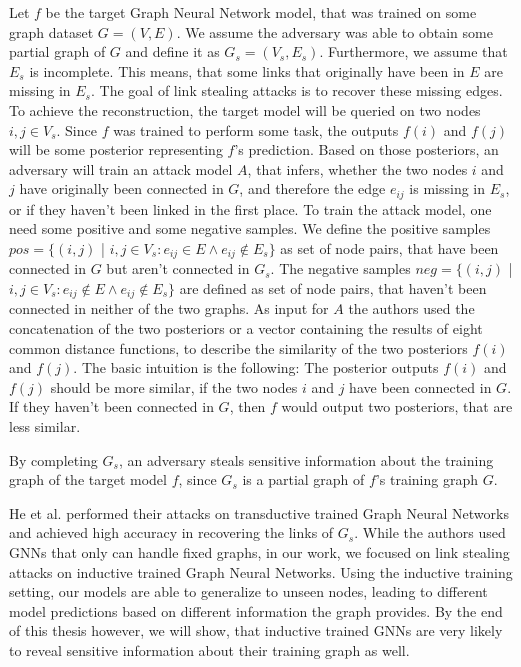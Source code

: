     Let $f$ be the target Graph Neural Network model, that was trained on some graph dataset $G = (V, E)$.
    We assume the adversary was able to obtain some partial graph of $G$ and define it as $G_s = (V_s, E_s)$.
    Furthermore, we assume that $E_s$ is incomplete.
    This means, that some links that originally have been in $E$ are missing in $E_s$.
    The goal of link stealing attacks is to recover these missing edges.
    To achieve the reconstruction, the target model will be queried on two nodes $i,j \in V_s$.
    Since $f$ was trained to perform some task, the outputs $f(i)$ and $f(j)$ will be some posterior representing $f$'s prediction.
    Based on those posteriors, an adversary will train an attack model $A$, that infers, whether the two nodes $i$ and $j$ have originally been connected in $G$, and therefore the edge $e_{ij}$ is missing in $E_s$, or if they haven't been linked in the first place.
    To train the attack model, one need some positive and some negative samples.
    We define the positive samples $pos = \{ (i,j)$ | $i,j \in V_s: e_{ij} \in E \wedge e_{ij} \not\in E_s\}$ as set of node pairs, that have been connected in $G$ but aren't connected in $G_s$. 
    The negative samples $neg = \{ (i,j)$ | $i,j \in V_s: e_{ij} \not\in E \wedge e_{ij} \not\in E_s\}$ are defined as set of node pairs, that haven't been connected in neither of the two graphs.
    As input for $A$ the authors used the concatenation of the two posteriors or a vector containing the results of eight common distance functions, to describe the similarity of the two posteriors $f(i)$ and $f(j)$.
    The basic intuition is the following: 
    The posterior outputs $f(i)$ and $f(j)$ should be more similar, if the two nodes $i$ and $j$ have been connected in $G$.
    If they haven't been connected in $G$, then $f$ would output two posteriors, that are less similar.

    By completing $G_s$, an adversary steals sensitive information about the training graph of the target model $f$, since $G_s$ is a partial graph of $f$'s training graph $G$.

    He et al. performed their attacks on transductive trained Graph Neural Networks and achieved high accuracy in recovering the links of $G_s$. 
    While the authors used GNNs that only can handle fixed graphs, 
    in our work, we focused on link stealing attacks on inductive trained Graph Neural Networks.
    Using the inductive training setting, our models are able to generalize to unseen nodes, leading to different model predictions based on different information the graph provides. By the end of this thesis however, we will show, that inductive trained GNNs are very likely to reveal sensitive information about their training graph as well.